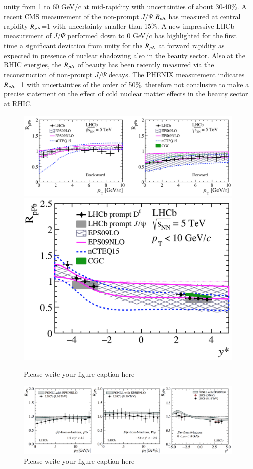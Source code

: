 \documentclass{webofc}
\begin{document}
unity from 1 to 60 GeV/c at mid-rapidity with uncertainties of about 30-40$\%$. A recent CMS measurement of the non-prompt $J/\Psi$ $R_{p \mathrm{A}}$ has measured at central rapidity $R_{p \mathrm{A}}$=1 with uncertainty smaller than 15$\%$. A new 
impressive LHCb measurement of $J/\Psi$ performed down to 0 GeV/c has highlighted for the first time a significant deviation from unity for the $R_{p \mathrm{A}}$ at forward rapidity as expected in presence of nuclear shadowing also in the beauty sector. 
Also at the RHIC energies, the $R_{p \mathrm{A}}$ of beauty has been recently measured via the reconstruction of non-prompt $J/\Psi$ decays. The PHENIX measurement indicates  $R_{p \mathrm{A}}$=1 with uncertainties of the order of 50$\%$, therefore not conclusive 
to make a precise statement on the effect of cold nuclear matter effects in the beauty sector at RHIC. 
\begin{figure}[ht]
\centering
\includegraphics[width=.65\textwidth]{Plots/DRpAvsptLHCb2017}
\includegraphics[width=.32\textwidth]{Plots/DRpALHCb2017}
\caption{Please write your figure caption here}
\label{RpA}     
\end{figure}


\begin{figure}[ht]
\centering
\includegraphics[width=.99\textwidth]{Plots/BRpAtLHC}
\caption{Please write your figure caption here}
\label{BRpA}     
\end{figure}
\end{document}
